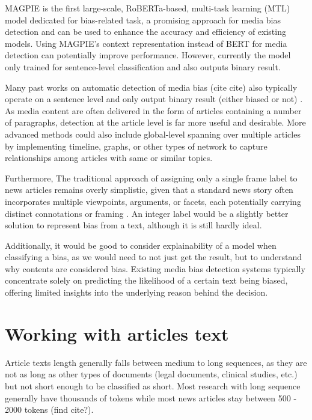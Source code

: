 MAGPIE \cite{horych-2024-magpie} is the first large-scale, RoBERTa-based, multi-task learning (MTL) model dedicated for bias-related task, a promising approach for media bias detection and can be used to enhance the accuracy and efficiency of existing models. Using MAGPIE's context representation instead of BERT for media detection can potentially improve performance. However, currently the model only trained for sentence-level classification and also outputs binary result.

Many past works on automatic detection of media bias (cite cite) also typically operate on a sentence level and only output binary result (either biased or not) \cite{van-den-berg-2020-context, maab-2023-target-aware, lei-2024-sentence}. As media content are often delivered in the form of articles containing a number of paragraphs, detection at the article level is far more useful and desirable. More advanced methods could also include global-level spanning over multiple articles by implementing timeline, graphs, or other types of network to capture relationships among articles with same or similar topics.

Furthermore, The traditional approach of assigning only a single frame label to news articles remains overly simplistic, given that a standard news story often incorporates multiple viewpoints, arguments, or facets, each potentially carrying distinct connotations or framing \cite{vallejo-2023-connecting}. An integer label would be a slightly better solution to represent bias from a text, although it is still hardly ideal.

Additionally, it would be good to consider explainability of a model when classifying a bias, as we would need to not just get the result, but to understand why contents are considered bias. Existing media bias detection systems typically concentrate solely on predicting the likelihood of a certain text being biased, offering limited insights into the underlying reason behind the decision.

\section{Working with articles text}

Article texts length generally falls between medium to long sequences, as they are not as long as other types of documents (legal documents, clinical studies, etc.) but not short enough to be classified as short. Most research with long sequence generally have thousands of tokens while most news articles stay between 500 - 2000 tokens (find cite?).

